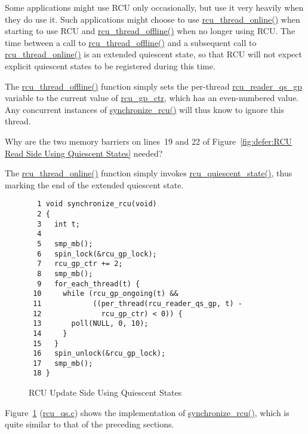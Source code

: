 Some applications might use RCU only occasionally, but use it very heavily
when they do use it.
Such applications might choose to use \url{rcu_thread_online()} when
starting to use RCU and \url{rcu_thread_offline()} when no longer
using RCU.
The time between a call to \url{rcu_thread_offline()} and a subsequent
call to \url{rcu_thread_online()} is an extended quiescent state,
so that RCU will not expect explicit quiescent states to be registered
during this time.

The \url{rcu_thread_offline()} function simply sets the
per-thread \url{rcu_reader_qs_gp} variable to the current value of
\url{rcu_gp_ctr}, which has an even-numbered value.
Any concurrent instances of \url{synchronize_rcu()} will thus know to
ignore this thread.

\QuickQuiz{}
	Why are the two memory barriers on lines~19 and 22 of
	Figure~\ref{fig:defer:RCU Read Side Using Quiescent States}
	needed?
 \QuickQuizEnd

The \url{rcu_thread_online()} function simply invokes
\url{rcu_quiescent_state()}, thus marking the end of the extended
quiescent state.

\begin{figure}[tbp]
{ \scriptsize
\begin{verbatim}
  1 void synchronize_rcu(void)
  2 {
  3   int t;
  4
  5   smp_mb();
  6   spin_lock(&rcu_gp_lock);
  7   rcu_gp_ctr += 2;
  8   smp_mb();
  9   for_each_thread(t) {
 10     while (rcu_gp_ongoing(t) &&
 11            ((per_thread(rcu_reader_qs_gp, t) -
 12              rcu_gp_ctr) < 0)) {
 13       poll(NULL, 0, 10);
 14     }
 15   }
 16   spin_unlock(&rcu_gp_lock);
 17   smp_mb();
 18 }
\end{verbatim}
}
\caption{RCU Update Side Using Quiescent States}
\label{fig:defer:RCU Update Side Using Quiescent States}
\end{figure}

Figure~\ref{fig:defer:RCU Update Side Using Quiescent States}
(\url{rcu_qs.c})
shows the implementation of \url{synchronize_rcu()}, which is
quite similar to that of the preceding sections.

